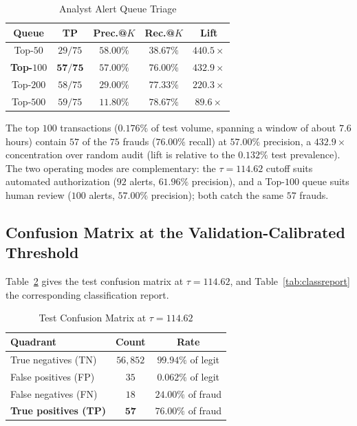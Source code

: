 \documentclass[conference]{IEEEtran}
\begin{document}
\begin{table}[!t]
\centering
\caption{Analyst Alert Queue Triage}
\renewcommand{\arraystretch}{1.15}
\footnotesize
\setlength{\tabcolsep}{3pt}
\begin{tabular}{ccccc}
\toprule
\textbf{Queue} & \textbf{TP} & \textbf{Prec.@$K$} & \textbf{Rec.@$K$} & \textbf{Lift} \\
\midrule
Top-$50$ & $29/75$ & $58.00\%$ & $38.67\%$ & $440.5\times$ \\
\textbf{Top-$100$} & $\mathbf{57/75}$ & $\mathbf{57.00\%}$ & $\mathbf{76.00\%}$ & $\mathbf{432.9\times}$ \\
Top-$200$ & $58/75$ & $29.00\%$ & $77.33\%$ & $220.3\times$ \\
Top-$500$ & $59/75$ & $11.80\%$ & $78.67\%$ & $89.6\times$ \\
\bottomrule
\end{tabular}
\label{tab:topk}
\end{table}

The top $100$ transactions ($0.176\%$ of test volume, spanning a window of about $7.6$ hours) contain $57$ of the $75$ frauds ($76.00\%$ recall) at $57.00\%$ precision, a $432.9\times$ concentration over random audit (lift is relative to the $0.132\%$ test prevalence). The two operating modes are complementary: the $\tau = 114.62$ cutoff suits automated authorization ($92$ alerts, $61.96\%$ precision), and a Top-$100$ queue suits human review ($100$ alerts, $57.00\%$ precision); both catch the same $57$ frauds.

\subsection{Confusion Matrix at the Validation-Calibrated Threshold}
Table~\ref{tab:cm} gives the test confusion matrix at $\tau = 114.62$, and Table~\ref{tab:classreport} the corresponding classification report.

\begin{table}[!t]
\centering
\caption{Test Confusion Matrix at $\tau = 114.62$}
\renewcommand{\arraystretch}{1.15}
\footnotesize
\begin{tabular}{lcc}
\toprule
\textbf{Quadrant} & \textbf{Count} & \textbf{Rate} \\
\midrule
True negatives (TN) & $56{,}852$ & $99.94\%$ of legit \\
False positives (FP) & $35$ & $0.062\%$ of legit \\
False negatives (FN) & $18$ & $24.00\%$ of fraud \\
\textbf{True positives (TP)} & $\mathbf{57}$ & $\mathbf{76.00\%}$ of fraud \\
\bottomrule
\end{tabular}
\label{tab:cm}
\end{table}
\end{document}
